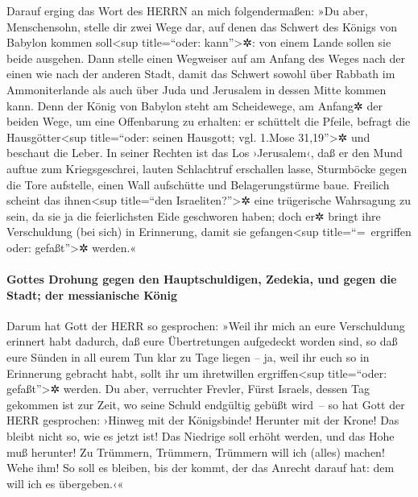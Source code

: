 Darauf erging das Wort des HERRN an mich folgendermaßen:
»Du aber, Menschensohn, stelle dir zwei Wege dar, auf
denen das Schwert des Königs von Babylon kommen soll\textless sup
title=``oder: kann''\textgreater✲: von einem Lande sollen sie beide
ausgehen. Dann stelle einen Wegweiser auf am Anfang des Weges nach der
einen wie nach der anderen Stadt, damit das Schwert
sowohl über Rabbath im Ammoniterlande als auch über Juda und Jerusalem
in dessen Mitte kommen kann. Denn der König von Babylon
steht am Scheidewege, am Anfang✲ der beiden Wege, um eine Offenbarung zu
erhalten: er schüttelt die Pfeile, befragt die Hausgötter\textless sup
title=``oder: seinen Hausgott; vgl. 1.Mose 31,19''\textgreater✲ und
beschaut die Leber. In seiner Rechten ist das Los
›Jerusalem‹, daß er den Mund auftue zum Kriegsgeschrei, lauten
Schlachtruf erschallen lasse, Sturmböcke gegen die Tore aufstelle, einen
Wall aufschütte und Belagerungstürme baue. Freilich
scheint das ihnen\textless sup title=``den Israeliten?''\textgreater✲
eine trügerische Wahrsagung zu sein, da sie ja die feierlichsten Eide
geschworen haben; doch er✲ bringt ihre Verschuldung (bei sich) in
Erinnerung, damit sie gefangen\textless sup title=``=~ergriffen oder:
gefaßt''\textgreater✲ werden.«

\hypertarget{gottes-drohung-gegen-den-hauptschuldigen-zedekia-und-gegen-die-stadt-der-messianische-kuxf6nig}{%
\paragraph{Gottes Drohung gegen den Hauptschuldigen, Zedekia, und gegen
die Stadt; der messianische
König}\label{gottes-drohung-gegen-den-hauptschuldigen-zedekia-und-gegen-die-stadt-der-messianische-kuxf6nig}}

Darum hat Gott der HERR so gesprochen: »Weil ihr mich an
eure Verschuldung erinnert habt dadurch, daß eure Übertretungen
aufgedeckt worden sind, so daß eure Sünden in all eurem Tun klar zu Tage
liegen -- ja, weil ihr euch so in Erinnerung gebracht habt, sollt ihr um
ihretwillen ergriffen\textless sup title=``oder: gefaßt''\textgreater✲
werden. Du aber, verruchter Frevler, Fürst Israels,
dessen Tag gekommen ist zur Zeit, wo seine Schuld endgültig gebüßt
wird~-- so hat Gott der HERR gesprochen: ›Hinweg mit der
Königsbinde! Herunter mit der Krone! Das bleibt nicht so, wie es jetzt
ist! Das Niedrige soll erhöht werden, und das Hohe muß herunter!
Zu Trümmern, Trümmern, Trümmern will ich (alles) machen!
Wehe ihm! So soll es bleiben, bis der kommt, der das Anrecht darauf hat:
dem will ich es übergeben.‹«


